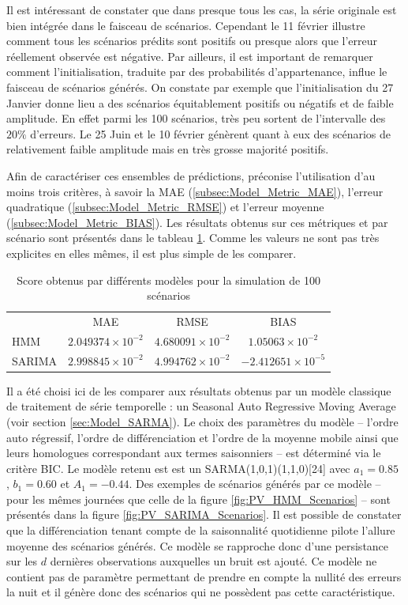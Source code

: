 \documentclass[12pt, french]{report}
\begin{document}
Il est intéressant de constater que dans presque tous les cas, la série originale est bien intégrée dans le faisceau de scénarios. Cependant le 11 février illustre comment tous les scénarios prédits sont positifs ou presque alors que l'erreur réellement observée est négative. Par ailleurs, il est important de remarquer comment l'initialisation, traduite par des probabilités d'appartenance, influe le faisceau de scénarios générés. On constate par exemple que l'initialisation du 27 Janvier donne lieu a des scénarios équitablement positifs ou négatifs et de faible amplitude. En effet parmi les 100 scénarios, très peu sortent de l'intervalle des $20\%$ d'erreurs. Le 25 Juin et le 10 février génèrent quant à eux des scénarios de relativement faible amplitude mais en très grosse majorité positifs.

Afin de caractériser ces ensembles de prédictions, \cite{madsen_protocol_nodate} préconise l'utilisation d'au moins trois critères, à savoir la MAE (\ref{subsec:Model_Metric_MAE}), l'erreur quadratique (\ref{subsec:Model_Metric_RMSE}) et l'erreur moyenne (\ref{subsec:Model_Metric_BIAS}). Les résultats obtenus sur ces métriques et par scénario sont présentés dans le tableau \ref{tab:PV_Metrics}. Comme les valeurs ne sont pas très explicites en elles mêmes, il est plus simple de les comparer.

\begin{table}[htbp]
	\centering
	\caption{Score obtenus par différents modèles pour la simulation de 100 scénarios}
	\label{tab:PV_Metrics}
	\begin{tabular}{lccc}
		& MAE  & RMSE & BIAS \\
		HMM	& $2.049374 \times 10^{-2}$ & $4.680091\times 10^{-2}$ & $1.05063 \times 10^{-2}$	    \\
		SARIMA	& $2.998845 \times 10^{-2}$ & $4.994762 \times 10^{-2}$ & $-2.412651 \times 10^{-5}$
	\end{tabular}
\end{table}

Il a été choisi ici de les comparer aux résultats obtenus par un modèle classique de traitement de série temporelle : un Seasonal Auto Regressive Moving Average (voir section \ref{sec:Model_SARMA}). Le choix des paramètres du modèle -- l'ordre auto régressif, l'ordre de différenciation et l'ordre de la moyenne mobile ainsi que leurs homologues correspondant aux termes saisonniers -- est déterminé via le critère BIC. Le modèle retenu est est un SARMA(1,0,1)(1,1,0)[24] avec $a_1 = 0.85$ , $b_1 = 0.60$ et $A_1 = -0.44$. Des exemples de scénarios générés par ce modèle -- pour les mêmes journées que celle de la figure \ref{fig:PV_HMM_Scenarios} -- sont présentés dans la figure \ref{fig:PV_SARIMA_Scenarios}. Il est possible de constater que la différenciation tenant compte de la saisonnalité quotidienne pilote l'allure moyenne des scénarios générés. Ce modèle se rapproche donc d'une persistance sur les $d$ dernières observations auxquelles un bruit est ajouté. Ce modèle ne contient pas de paramètre permettant de prendre en compte la nullité des erreurs la nuit et il génère donc des scénarios qui ne possèdent pas cette caractéristique.
\end{document}
